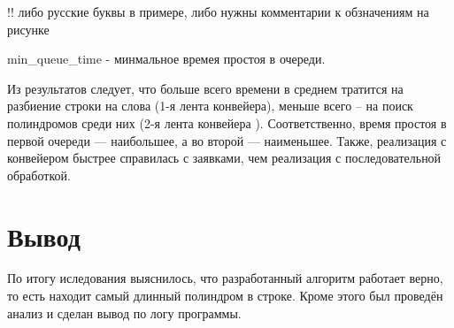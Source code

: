 !! либо русские буквы в примере, либо нужны комментарии к обзначениям на рисунке

min_queue_time - минмальное времея простоя в очереди.

\newpage
Из результатов следует, что больше всего  времени в среднем тратится на разбиение строки на слова (1-я лента конвейера), меньше всего -- на поиск полиндромов среди них (2-я лента конвейера
). Соответственно, время простоя в первой очереди --- наибольшее, а во второй --- наименьшее. Также, реализация с конвейером быстрее справилась с заявками, чем реализация с последовательной обработкой.

\section{Вывод}
По итогу иследования выяснилось, что разработанный алгоритм работает верно, то есть находит самый длинный полиндром в строке. Кроме этого был проведён анализ и сделан вывод по логу программы.